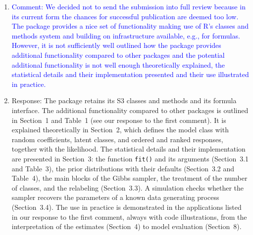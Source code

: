 \documentclass[12pt,a4paper]{article}
\begin{document}
\begin{enumerate}
    matrix, and each draw is permuted to agree with it by the equivalence
    classes representatives algorithm of \textcite{Papastamoulis2010}. The
    reference is then reset to the most frequent relabeled class of every
    decider until it is stable, and all class-specific parameters and the
    allocations are permuted accordingly. Since the relabeling is based on the
    allocations of all deciders, it does not require the classes to be separated
    in one particular parameter, whereas an ordering constraint does. The
    classes are then numbered by decreasing posterior mean weight. In the
    simulation of Section~3.4, whose three classes have equal weights and
    therefore cannot be identified by an ordering constraint on the weights, the
    relabeled class weights and means are close to their true values, with a
    rank-normalized $\hat{R}$ \parencite{Vehtari2021} of at most 1.01.
    \item \textcolor{blue}{Comment: We decided not to send the submission into
    full review because in its current form the chances for successful
    publication are deemed too low. The package provides a nice set of
    functionality making use of R's classes and methods system and building on
    infrastructure available, e.g., for formulas. However, it is not
    sufficiently well outlined how the package provides additional
    functionality compared to other packages and the potential additional
    functionality is not well enough theoretically explained, the statistical
    details and their implementation presented and their use illustrated in
    practice.}
    \item[] Response: The package retains its S3 classes and methods and its
    formula interface. The additional functionality compared to other packages
    is outlined in Section~1 and Table~1 (see our response to the first
    comment). It is explained theoretically in Section~2, which defines the
    model class with random coefficients, latent classes, and ordered and ranked
    responses, together with the likelihood. The statistical details and their
    implementation are presented in Section~3: the function \texttt{fit()} and
    its arguments (Section~3.1 and Table~3), the prior distributions with their
    defaults (Section~3.2 and Table~4), the main blocks of the Gibbs sampler,
    the treatment of the number of classes, and the relabeling (Section~3.3). A
    simulation checks whether the sampler recovers the parameters of a known
    data generating process (Section~3.4). The use in practice is demonstrated
    in the applications listed in our response to the first comment, always with
    code illustrations, from the interpretation of the estimates (Section~4) to
    model evaluation (Section~8).
\end{enumerate}
\end{document}
